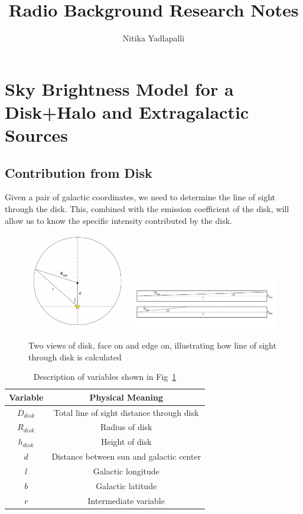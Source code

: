 \documentclass[letterpaper, 10pt]{article}
\title{Radio Background Research Notes}
\author{Nitika Yadlapalli}
\date{}
\begin{document}
\maketitle

\section{Sky Brightness Model for a Disk+Halo and Extragalactic Sources}

\subsection{Contribution from Disk}
Given a pair of galactic coordinates, we need to determine the line of sight through the disk. This, combined with the emission coefficient of the disk, will allow us to know the specific intensity contributed by the disk.

\begin{figure}[h]
\begin{center}
\includegraphics[width=0.39\textwidth]{disk_face.jpg}
\includegraphics[width=0.59\textwidth]{disk_edge.jpg}
\caption{Two views of disk, face on and edge on, illustrating how line of sight through disk is calculated}
\label{disk}
\end{center}
\end{figure}

\begin{table}[h]
\centering
\begin{tabular}{| c | c |}
\hline
\textbf{Variable} & \textbf{Physical Meaning} \\
\hline
$D_{disk}$ & Total line of sight distance through disk \\
\hline
$R_{disk}$ & Radius of disk \\
\hline
$h_{disk}$ & Height of disk \\
\hline
$d$ & Distance between sun and galactic center \\
\hline
$l$ & Galactic longitude \\
\hline
$b$ & Galactic latitude \\
\hline
$r$ & Intermediate variable \\
\hline
\end{tabular}
\caption{Description of variables shown in Fig~\ref{disk}}
\end{table}
\end{document}
